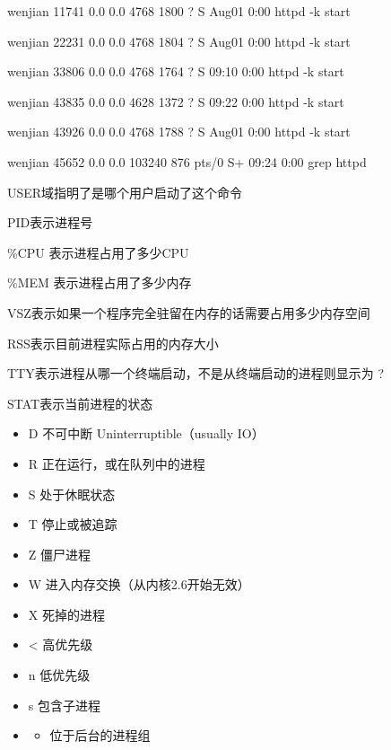 \documentclass[letterpaper,10pt]{sphinxmanual}
\begin{document}
wenjian  11741  0.0  0.0   4768  1800 ?        S    Aug01   0:00 httpd -k start

wenjian  22231  0.0  0.0   4768  1804 ?        S    Aug01   0:00 httpd -k start

wenjian  33806  0.0  0.0   4768  1764 ?        S    09:10   0:00 httpd -k start

wenjian  43835  0.0  0.0   4628  1372 ?        S    09:22   0:00 httpd -k start

wenjian  43926  0.0  0.0   4768  1788 ?        S    Aug01   0:00 httpd -k start

wenjian  45652  0.0  0.0 103240   876 pts/0    S+   09:24   0:00 grep httpd

USER域指明了是哪个用户启动了这个命令

PID表示进程号

\%CPU 表示进程占用了多少CPU

\%MEM 表示进程占用了多少内存

VSZ表示如果一个程序完全驻留在内存的话需要占用多少内存空间

RSS表示目前进程实际占用的内存大小

TTY表示进程从哪一个终端启动，不是从终端启动的进程则显示为 ?

STAT表示当前进程的状态
\begin{itemize}
\item {} 
D 不可中断 Uninterruptible（usually IO）

\item {} 
R 正在运行，或在队列中的进程

\item {} 
S 处于休眠状态

\item {} 
T 停止或被追踪

\item {} 
Z 僵尸进程

\item {} 
W 进入内存交换（从内核2.6开始无效）

\item {} 
X   死掉的进程

\item {} 
\textless{} 高优先级

\item {} 
n   低优先级

\item {} 
s   包含子进程

\item {} \begin{itemize}
\item {} 
位于后台的进程组

\end{itemize}

\end{itemize}
\end{document}
